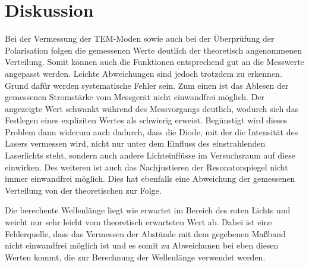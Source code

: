 \section{Diskussion}
\label{sec:Diskussion}

Bei der Vermessung der TEM-Moden sowie auch bei der Überprüfung der Polarisation
folgen die gemessenen Werte deutlich der theoretisch angenommenen Verteilung. Somit
können auch die Funktionen entsprechend gut an die Messwerte angepasst werden.
Leichte Abweichungen sind jedoch trotzdem zu erkennen. Grund dafür werden systematische
Fehler sein. Zum einen ist das Ablesen der gemessenen Stromstärke vom Messgerät nicht
einwandfrei möglich. Der angezeigte Wert schwankt während des Messvorgangs deutlich,
wodurch sich das Festlegen eines expliziten Wertes als schwierig erweist. Begünstigt wird
dieses Problem dann widerum auch dadurch, dass die Diode, mit der die Intensität des Lasers
vermessen wird, nicht nur unter dem Einfluss des einstrahlenden Laserlichts steht, sondern
auch andere Lichteinflüsse im Versuchsraum auf diese einwirken. Des weiteren ist auch
das Nachjustieren der Resonatorspiegel nicht immer einwandfrei möglich. Dies hat ebenfalls
eine Abweichung der gemessenen Verteilung von der theoretischen zur Folge.

Die berechente Wellenlänge liegt wie erwartet im Bereich des roten Lichts und weicht
nur sehr leicht vom theoretisch erwarteten Wert ab. Dabei ist eine Fehlerquelle,
dass das Vermessen der Abstände mit dem gegebenen Maßband nicht einwandfrei
möglich ist und es somit zu Abweichunen bei eben diesen Werten kommt, die zur Berechnung
der Wellenlänge verwendet werden.
